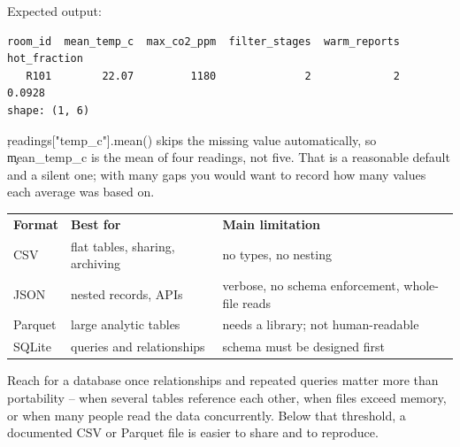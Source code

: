 Expected output:

\begin{lstlisting}[language=text, style=block, caption={The destination every path was heading toward}, label={c14_combined_output}, captionpos=b]
room_id  mean_temp_c  max_co2_ppm  filter_stages  warm_reports  hot_fraction
   R101        22.07         1180              2             2        0.0928
shape: (1, 6)
\end{lstlisting}

\c{readings["temp_c"].mean()} skips the missing value automatically, so
\c{mean_temp_c} is the mean of four readings, not five. That is a reasonable
default and a silent one; with many gaps you would want to record how many
values each average was based on.


\begin{center}
\begin{tabular}{lll}
\textbf{Format} & \textbf{Best for} & \textbf{Main limitation} \\
CSV & flat tables, sharing, archiving & no types, no nesting \\
JSON & nested records, APIs & verbose, no schema enforcement, whole-file reads \\
Parquet & large analytic tables & needs a library; not human-readable \\
SQLite & queries and relationships & schema must be designed first \\
\end{tabular}
\end{center}

Reach for a database once relationships and repeated queries matter more than
portability -- when several tables reference each other, when files exceed
memory, or when many people read the data concurrently. Below that threshold, a
documented CSV or Parquet file is easier to share and to reproduce.


